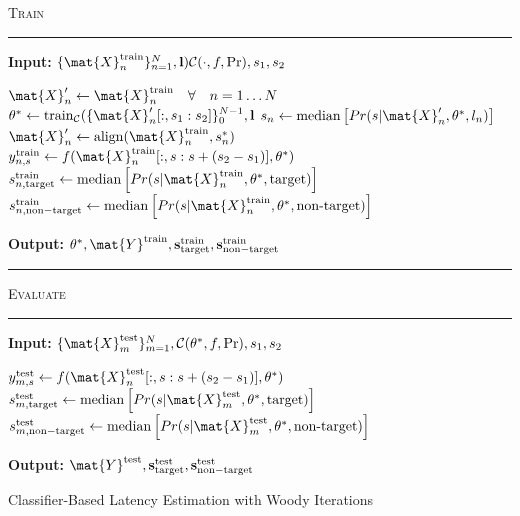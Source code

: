 \begin{algorithm}[H]
	\textsc{Train}
	\smallskip \hrule \smallskip
	\textbf{Input:} $\{\mat{X}_n^\mathrm{train}\}_{n=1}^N, \mathbf{l})
		\mathcal{C}(\cdot,f,\Pr), s_1, s_2$
	\begin{algorithmic}[1]
		\State $\mat{X}'_n \gets \mat{X}^\mathrm{train}_n \quad \forall \quad n=1\ldots
    N$
		\Repeat
		\State $\theta^* \gets \mathrm{train}_\mathcal{C}(\{\mat{X}'_n[:,s_1:s_2]\}_0^{N-1},\mathbf{l}$
    \State  $s_n \gets
			    \mathrm{median}\left[Pr(s|\mat{X}_n',\theta^*,l_n)\right]$
		\State $\mat{X}'_n \gets \mathrm{align}(\mat{X}^\mathrm{train}_n, s^*_n)$
		\EndFor
      \State $y_{n,s}^\mathrm{train} \gets
      f(\mat{X}_n^\mathrm{train}[:,s:s+(s_2-s_1)],\theta^*)$
        \EndFor
        \State $s_{n,\mathrm{target}}^\mathrm{train} \gets
			    \mathrm{median}\left[Pr(s|\mat{X}_n^\mathrm{train},\theta^*,\mathrm{target})\right]$
		    \State $s_{n,\mathrm{non-target}}^\mathrm{train}\gets
			    \mathrm{median}\left[Pr(s|\mat{X}_n^\mathrm{train},\theta^*,\textrm{non-target})\right]$
    \EndFor

	\end{algorithmic}
	\textbf{Output:} $\theta^*,
  \mat{Y}^\mathrm{train},
  \mathbf{s}_\mathrm{target}^\mathrm{train},
  \mathbf{s}_\mathrm{non-target}^\mathrm{train}$

	\smallskip \hrule \smallskip
	\textsc{Evaluate}
	\smallskip \hrule \smallskip
	\textbf{Input:} $\{\mat{X}_m^\mathrm{test}\}_{m=1}^N, \mathcal{C}(\theta^*,f, \Pr), s_1, s_2$
  \begin{algorithmic}[1]
      \State $y_{m,s}^\mathrm{test} \gets
      f(\mat{X}_n^\mathrm{test}[:,s:s+(s_2-s_1)],\theta^*)$
        \EndFor
        \State $s_{m,\mathrm{target}}^\mathrm{test} \gets
			    \mathrm{median}\left[Pr(s|\mat{X}_m^\mathrm{test},\theta^*,\mathrm{target})\right]$
		    \State $s_{m,\mathrm{non-target}}^\mathrm{test}\gets
			    \mathrm{median}\left[Pr(s|\mat{X}_m^\mathrm{test},\theta^*,\textrm{non-target})\right]$
    \EndFor
	\end{algorithmic}
  \textbf{Output:} $\mat{Y}^\mathrm{test},
  \mathbf{s}_\mathrm{target}^\mathrm{test},
  \mathbf{s}_\mathrm{non-target}^\mathrm{test}$
	\caption{Classifier-Based Latency Estimation with Woody Iterations}
	\label{alg:wcble}
\end{algorithm}

